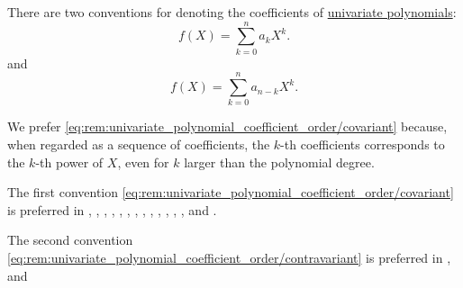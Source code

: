 \begin{remark}\label{rem:univariate_polynomial_coefficient_order}
  There are two conventions for denoting the coefficients of \hyperref[def:univariate_polynomial]{univariate polynomials}:
  \begin{equation}\label{eq:rem:univariate_polynomial_coefficient_order/covariant}
    f(X) = \sum_{k=0}^n a_k X^k.
  \end{equation}
  and
  \begin{equation}\label{eq:rem:univariate_polynomial_coefficient_order/contravariant}
    f(X) = \sum_{k=0}^n a_{n-k} X^k.
  \end{equation}

  We prefer \eqref{eq:rem:univariate_polynomial_coefficient_order/covariant} because, when regarded as a sequence of coefficients, the \( k \)-th coefficients corresponds to the \( k \)-th power of \( X \), even for \( k \) larger than the polynomial degree.

  \begin{thmenum}
     The first convention \eqref{eq:rem:univariate_polynomial_coefficient_order/covariant} is preferred in
    \cite[97]{Lang2002Algebra},
    \cite[44]{Rotman2015AdvancedModernAlgebraPart1},
    \cite[9]{Knapp2016BasicAlgebra},
    \cite[def. III.1.19]{Aluffi2009Algebra},
    \cite[120]{Jacobson1985BasicAlgebraI},
    \cite[10]{FriedbergInselSpence2018LinearAlgebra},
    \cite[28]{Ahlfors1979ComplexAnalysis},
    \cite[\S 8.24]{Schechter1997AnalysisHandbook},
    \cite[96]{Маркушевич1967АналитическиеФункцииТом1},
    \cite[93]{Винберг2014КурсАлгебры},
    \cite[180]{Кострикин2020АлгебраЧасть1},
    \cite[118]{Тыртышников2017ОсновыАлгебры},
    \cite[132]{Окунев1951КольцоМногочленов},
    \cite[22]{ГеновМиховскиМоллов1991Алгебра} and
    \cite[120]{ИлинСадовничиСендов1984АнализТом1}.

     The second convention \eqref{eq:rem:univariate_polynomial_coefficient_order/contravariant} is preferred in
    \cite[131]{Курош1968КурсВысшейАлгебры},
    \cite[1]{Обрешков1962ВисшаАлгебра} and
    \cite[1]{Боянов2008ЧислениМетоди}
  \end{thmenum}
\end{remark}


